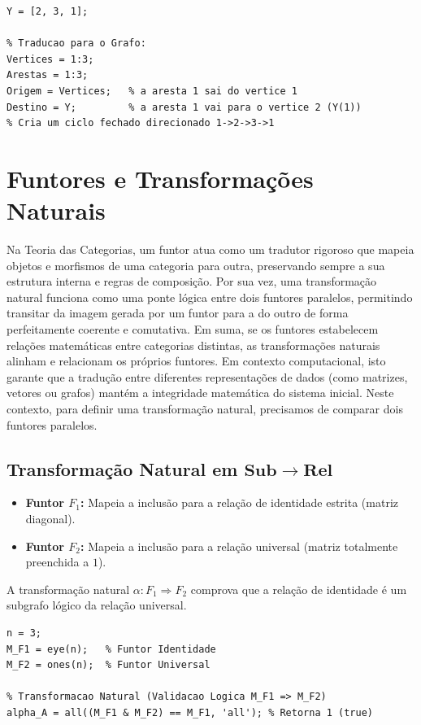 \documentclass[11pt,a4paper]{article}
\begin{document}
\begin{lstlisting}[caption={Exemplo de End para Graph em MATLAB}]
% Endoaplicacao Y : {1,2,3} -> {1,2,3}
Y = [2, 3, 1]; 

% Traducao para o Grafo:
Vertices = 1:3;
Arestas = 1:3;
Origem = Vertices;   % a aresta 1 sai do vertice 1
Destino = Y;         % a aresta 1 vai para o vertice 2 (Y(1))
% Cria um ciclo fechado direcionado 1->2->3->1
\end{lstlisting}
\newpage


\section{Funtores e Transformações Naturais}
Na Teoria das Categorias, um funtor atua como um tradutor rigoroso que mapeia objetos e morfismos de uma categoria para outra, preservando sempre a sua estrutura interna e regras de composição. Por sua vez, uma transformação natural funciona como uma ponte lógica entre dois funtores paralelos, permitindo transitar da imagem gerada por um funtor para a do outro de forma perfeitamente coerente e comutativa. Em suma, se os funtores estabelecem relações matemáticas entre categorias distintas, as transformações naturais alinham e relacionam os próprios funtores. Em contexto computacional, isto garante que a tradução entre diferentes representações de dados (como matrizes, vetores ou grafos) mantém a integridade matemática do sistema inicial. Neste contexto, para definir uma transformação natural, precisamos de comparar dois funtores paralelos. 
\subsection{Transformação Natural em $\mathbf{Sub} \to \mathbf{Rel}$}
\begin{itemize}
    \item \textbf{Funtor $F_1$:} Mapeia a inclusão para a relação de identidade estrita (matriz diagonal).
    \item \textbf{Funtor $F_2$:} Mapeia a inclusão para a relação universal (matriz totalmente preenchida a $1$).
\end{itemize}
A transformação natural $\alpha: F_1 \Rightarrow F_2$ comprova que a relação de identidade é um subgrafo lógico da relação universal.

\begin{lstlisting}[caption={Transformacao em Sub -> Rel}]
n = 3;
M_F1 = eye(n);   % Funtor Identidade
M_F2 = ones(n);  % Funtor Universal

% Transformacao Natural (Validacao Logica M_F1 => M_F2)
alpha_A = all((M_F1 & M_F2) == M_F1, 'all'); % Retorna 1 (true)
\end{lstlisting}
\end{document}
